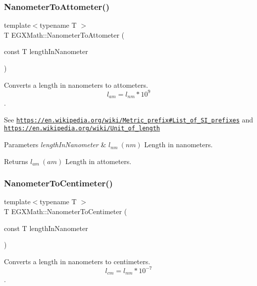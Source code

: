 \subsubsection{\texorpdfstring{Nanometer\+To\+Attometer()}{NanometerToAttometer()}}
{\footnotesize\ttfamily template$<$typename T $>$ \\
T E\+G\+X\+Math\+::\+Nanometer\+To\+Attometer (\begin{DoxyParamCaption}\item[{const T}]{length\+In\+Nanometer }\end{DoxyParamCaption})}



Converts a length in nanometers to attometers. \[ l_{am}=l_{nm} * 10^{9} \]. 

See \href{https://en.wikipedia.org/wiki/Metric_prefix#List_of_SI_prefixes}{\tt https\+://en.\+wikipedia.\+org/wiki/\+Metric\+\_\+prefix\#\+List\+\_\+of\+\_\+\+S\+I\+\_\+prefixes} and \href{https://en.wikipedia.org/wiki/Unit_of_length}{\tt https\+://en.\+wikipedia.\+org/wiki/\+Unit\+\_\+of\+\_\+length} 
\begin{DoxyParams}{Parameters}
{\em length\+In\+Nanometer} & $ l_{nm}\ (nm)$ Length in nanometers. \\
\hline
\end{DoxyParams}
\begin{DoxyReturn}{Returns}
$ l_{am}\ (am)$ Length in attometers. 
\end{DoxyReturn}
\mbox{\label{group___e_g_x_math-_conversions-_length_conversions-_s_i-_nanometer-_s_i_ga8c37dcaf6ef783c2cf44af0f65633841}} 
\subsubsection{\texorpdfstring{Nanometer\+To\+Centimeter()}{NanometerToCentimeter()}}
{\footnotesize\ttfamily template$<$typename T $>$ \\
T E\+G\+X\+Math\+::\+Nanometer\+To\+Centimeter (\begin{DoxyParamCaption}\item[{const T}]{length\+In\+Nanometer }\end{DoxyParamCaption})}



Converts a length in nanometers to centimeters. \[ l_{cm}=l_{nm} * 10^{-7} \]. 

